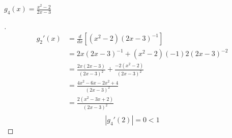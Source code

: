 \documentclass[12pt]{article}
\newenvironment{exercise}[2][Exercise]{\begin{trivlist}
\item[\hskip \labelsep {\bfseries #1}\hskip \labelsep {\bfseries #2.}]}{\end{trivlist}}
\begin{document}
\begin{exercise}{4} $g_4(x) = \frac{x^2 - 2}{2x - 3}$
\end{exercise}
\begin{proof}[]
	\vspace{-8mm}
	\begin{align*}
		g_2'(x) &= \frac{d}{dx}\left[  (x^2 - 2)(2x - 3)^{-1} \right] \\
		&= 2x(2x - 3)^{-1} + (x^2 - 2)(-1)2(2x-3)^{-2} \\
		&= \frac{2x(2x-3)}{(2x - 3)^2} + \frac{-2(x^2 - 2)}{(2x-3)^2} \\
		&= \frac{4x^2 - 6x - 2x^2 + 4}{(2x-3)^2} \\
		&= \frac{2(x^2 - 3x + 2)}{(2x-3)^2} \\
	\end{align*}
	\[\boxed{ \; |g_4'(2)| = 0 < 1 \; }\] 
\end{proof}
\end{document}
